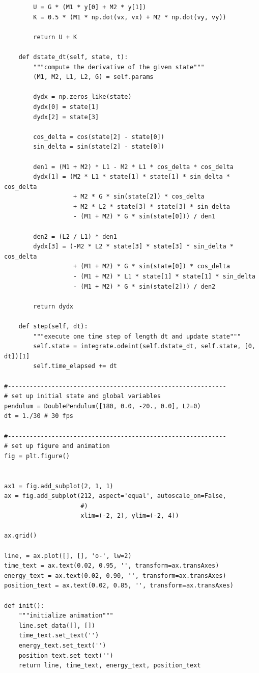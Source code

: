 \documentclass[12pt,letterpaper]{article}
\begin{document}
\begin{verbatim}
        U = G * (M1 * y[0] + M2 * y[1])
        K = 0.5 * (M1 * np.dot(vx, vx) + M2 * np.dot(vy, vy))

        return U + K

    def dstate_dt(self, state, t):
        """compute the derivative of the given state"""
        (M1, M2, L1, L2, G) = self.params

        dydx = np.zeros_like(state)
        dydx[0] = state[1]
        dydx[2] = state[3]

        cos_delta = cos(state[2] - state[0])
        sin_delta = sin(state[2] - state[0])

        den1 = (M1 + M2) * L1 - M2 * L1 * cos_delta * cos_delta
        dydx[1] = (M2 * L1 * state[1] * state[1] * sin_delta * cos_delta
                   + M2 * G * sin(state[2]) * cos_delta
                   + M2 * L2 * state[3] * state[3] * sin_delta
                   - (M1 + M2) * G * sin(state[0])) / den1

        den2 = (L2 / L1) * den1
        dydx[3] = (-M2 * L2 * state[3] * state[3] * sin_delta * cos_delta
                   + (M1 + M2) * G * sin(state[0]) * cos_delta
                   - (M1 + M2) * L1 * state[1] * state[1] * sin_delta
                   - (M1 + M2) * G * sin(state[2])) / den2
        
        return dydx

    def step(self, dt):
        """execute one time step of length dt and update state"""
        self.state = integrate.odeint(self.dstate_dt, self.state, [0, dt])[1]
        self.time_elapsed += dt

#------------------------------------------------------------
# set up initial state and global variables
pendulum = DoublePendulum([180, 0.0, -20., 0.0], L2=0)
dt = 1./30 # 30 fps

#------------------------------------------------------------
# set up figure and animation
fig = plt.figure()


ax1 = fig.add_subplot(2, 1, 1)
ax = fig.add_subplot(212, aspect='equal', autoscale_on=False,
                     #)
                     xlim=(-2, 2), ylim=(-2, 4))

ax.grid()

line, = ax.plot([], [], 'o-', lw=2)
time_text = ax.text(0.02, 0.95, '', transform=ax.transAxes)
energy_text = ax.text(0.02, 0.90, '', transform=ax.transAxes)
position_text = ax.text(0.02, 0.85, '', transform=ax.transAxes)

def init():
    """initialize animation"""
    line.set_data([], [])
    time_text.set_text('')
    energy_text.set_text('')
    position_text.set_text('')
    return line, time_text, energy_text, position_text


\end{verbatim}
\end{document}
